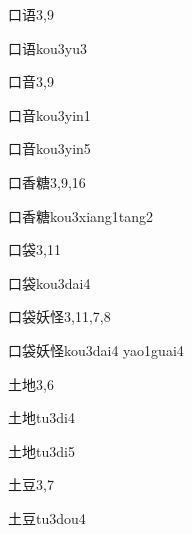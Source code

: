 \begin{entry}{口语}{3,9}
  \begin{phonetics}{口语}{kou3yu3}
  \end{phonetics}
\end{entry}

\begin{entry}{口音}{3,9}
  \begin{phonetics}{口音}{kou3yin1}
  \end{phonetics}
  \begin{phonetics}{口音}{kou3yin5}
  \end{phonetics}
\end{entry}

\begin{entry}{口香糖}{3,9,16}
  \begin{phonetics}{口香糖}{kou3xiang1tang2}
  \end{phonetics}
\end{entry}

\begin{entry}{口袋}{3,11}
  \begin{phonetics}{口袋}{kou3dai4}
  \end{phonetics}
\end{entry}

\begin{entry}{口袋妖怪}{3,11,7,8}
  \begin{phonetics}{口袋妖怪}{kou3dai4 yao1guai4}
  \end{phonetics}
\end{entry}

\begin{entry}{土地}{3,6}
  \begin{phonetics}{土地}{tu3di4}
  \end{phonetics}
  \begin{phonetics}{土地}{tu3di5}
  \end{phonetics}
\end{entry}

\begin{entry}{土豆}{3,7}
  \begin{phonetics}{土豆}{tu3dou4}
  \end{phonetics}
\end{entry}

